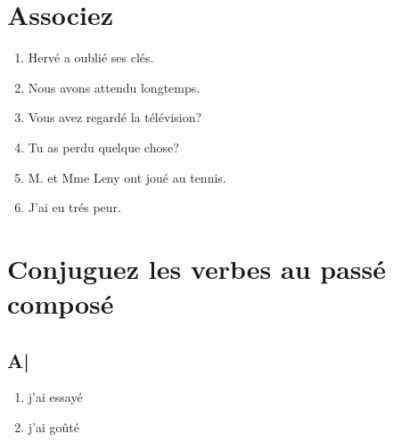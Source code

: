 \section{Associez}

\begin{enumerate}
    \item Hervé a oublié ses clés.
    \item Nous avons attendu longtemps.
    \item Vous avez regardé la télévision?
    \item Tu as perdu quelque chose?
    \item M. et Mme Leny ont joué au tennis.
    \item J'ai eu trés peur.
\end{enumerate}

\section{Conjuguez les verbes au passé composé}

\subsection{A|}

\begin{enumerate}
    \item j'ai essayé
    \item j'ai goûté
\end{enumerate}